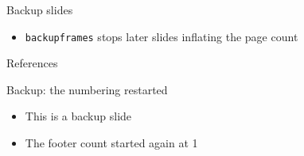 \documentclass[11pt,aspectratio=43]{beamer}
\newcommand{\howto}[1]{}
\begin{document}
\begin{frame}{Backup slides}
  \begin{itemize}
    \item \texttt{backupframes} stops later slides inflating the page count
  \end{itemize}
  \howto{backup}
\end{frame}

\begin{frame}[allowframebreaks]{References}
  \footnotesize
  
  
\end{frame}

\backupframes

\begin{frame}{Backup: the numbering restarted}
  \begin{itemize}
    \item This is a backup slide
    \item The footer count started again at 1
  \end{itemize}
\end{frame}
\end{document}
